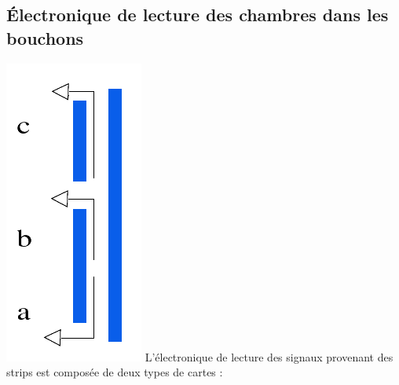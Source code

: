 \subsection{Électronique de lecture des chambres dans les bouchons}
\label{elecc}
\vspace{-0.2cm}
\marginpar
{
	\centering
	\includegraphics[width=\marginparwidth]{RPC/signalextraction.png}
	\label{extraction}
}
L'électronique de lecture des signaux provenant des strips est composée de deux types de cartes :
